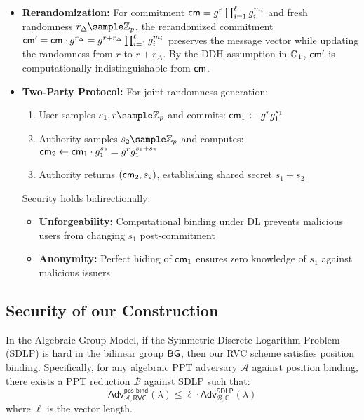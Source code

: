 \begin{itemize}
    \item \textbf{Rerandomization:} For commitment $\mathsf{cm} = g^r\prod_{i=1}^\ell g_i^{m_i}$ and fresh randomness $r_\Delta \sample \Z_p$, the rerandomized commitment $\mathsf{cm}' = \mathsf{cm} \cdot g^{r_\Delta} = g^{r+r_\Delta}\prod_{i=1}^\ell g_i^{m_i}$ preserves the message vector while updating the randomness from $r$ to $r + r_\Delta$. By the DDH assumption in $\mathbb{G}_1$, $\mathsf{cm}'$ is computationally indistinguishable from $\mathsf{cm}$.
    
    \item \textbf{Two-Party Protocol:} For joint randomness generation:
    \begin{enumerate}
        \item User samples $s_1, r \sample \Z_p$ and commits: $\mathsf{cm}_1 \gets g^r g_1^{s_1}$
        \item Authority samples $s_2 \sample \Z_p$ and computes: $\mathsf{cm}_2 \gets \mathsf{cm}_1 \cdot g_1^{s_2} = g^r g_1^{s_1 + s_2}$
        \item Authority returns $(\mathsf{cm}_2, s_2)$, establishing shared secret $s_1 + s_2$
    \end{enumerate}
    
    Security holds bidirectionally:
    \begin{itemize}
        \item \textbf{Unforgeability:} Computational binding under DL prevents malicious users from changing $s_1$ post-commitment
        \item \textbf{Anonymity:} Perfect hiding of $\mathsf{cm}_1$ ensures zero knowledge of $s_1$ against malicious issuers
    \end{itemize}
\end{itemize}

\subsection{Security of our Construction}



% 
% 
% 
% 
% 
% 



\begin{theorem}
    In the Algebraic Group Model, if the Symmetric Discrete Logarithm Problem (SDLP) is hard in the bilinear group $\mathsf{BG}$, then our RVC scheme satisfies position binding. Specifically, for any algebraic PPT adversary $\mathcal{A}$ against position binding, there exists a PPT reduction $\mathcal{B}$ against SDLP such that:
    \[
        \mathsf{Adv}^{\mathsf{pos\text{-}bind}}_{\mathcal{A},\mathsf{RVC}}(\lambda) \leq \ell \cdot \mathsf{Adv}^{\mathsf{SDLP}}_{\mathcal{B},\mathbb{G}}(\lambda)
    \]
    where $\ell$ is the vector length.
\end{theorem}

